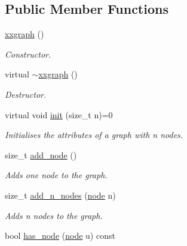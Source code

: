 \subsection*{Public Member Functions}
\begin{DoxyCompactItemize}
\item 
\hyperlink{classlgraph_1_1utils_1_1xxgraph_a24cdfcb0cc82745b1ea44595b23f61bc}{xxgraph} ()\hypertarget{classlgraph_1_1utils_1_1xxgraph_a24cdfcb0cc82745b1ea44595b23f61bc}{}\label{classlgraph_1_1utils_1_1xxgraph_a24cdfcb0cc82745b1ea44595b23f61bc}

\begin{DoxyCompactList}\small\item\em Constructor. \end{DoxyCompactList}\item 
virtual \hyperlink{classlgraph_1_1utils_1_1xxgraph_a45d2fb9099f70fc2a8b1c651f4c6d6ce}{$\sim$xxgraph} ()\hypertarget{classlgraph_1_1utils_1_1xxgraph_a45d2fb9099f70fc2a8b1c651f4c6d6ce}{}\label{classlgraph_1_1utils_1_1xxgraph_a45d2fb9099f70fc2a8b1c651f4c6d6ce}

\begin{DoxyCompactList}\small\item\em Destructor. \end{DoxyCompactList}\item 
virtual void \hyperlink{classlgraph_1_1utils_1_1xxgraph_a2ac8b3e71fa0550248c692a19ea04d0d}{init} (size\+\_\+t n)=0
\begin{DoxyCompactList}\small\item\em Initialises the attributes of a graph with {\itshape n} nodes. \end{DoxyCompactList}\item 
size\+\_\+t \hyperlink{classlgraph_1_1utils_1_1xxgraph_af41baf2c098e872731ad646aeec1b382}{add\+\_\+node} ()
\begin{DoxyCompactList}\small\item\em Adds one node to the graph. \end{DoxyCompactList}\item 
size\+\_\+t \hyperlink{classlgraph_1_1utils_1_1xxgraph_af4f3782c1a55f73c6f34f2f2c26fb404}{add\+\_\+n\+\_\+nodes} (\hyperlink{namespacelgraph_1_1utils_ab9c6b34241f0b68372c55f34c460e863}{node} n)
\begin{DoxyCompactList}\small\item\em Adds {\itshape n} nodes to the graph. \end{DoxyCompactList}\item 
bool \hyperlink{classlgraph_1_1utils_1_1xxgraph_a026ab064c2be26790cc1f547be2157c9}{has\+\_\+node} (\hyperlink{namespacelgraph_1_1utils_ab9c6b34241f0b68372c55f34c460e863}{node} u) const \hypertarget{classlgraph_1_1utils_1_1xxgraph_a026ab064c2be26790cc1f547be2157c9}{}\label{classlgraph_1_1utils_1_1xxgraph_a026ab064c2be26790cc1f547be2157c9}


\end{DoxyCompactItemize}
